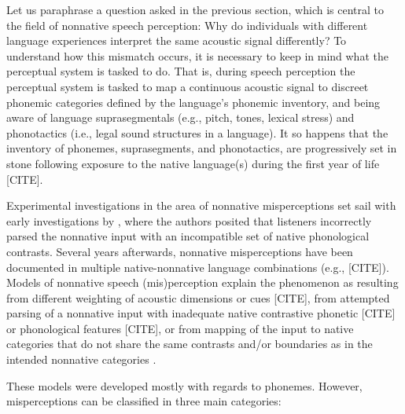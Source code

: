 Let us paraphrase a question asked in the previous section, which is central to the field of nonnative speech perception: Why do individuals with different language experiences interpret the same acoustic signal differently? To understand how this mismatch occurs, it is necessary to keep in mind what the perceptual system is tasked to do. That is, during speech perception the perceptual system is tasked to map a continuous acoustic signal to discreet phonemic categories defined by the language's phonemic inventory, and being aware of language suprasegmentals (e.g., pitch, tones, lexical stress) and phonotactics (i.e., legal sound structures in a language). It so happens that the inventory of phonemes, suprasegments, and phonotactics, are progressively set in stone following exposure to the native language(s) during the first year of life [CITE].

Experimental investigations in the area of nonnative misperceptions set sail with early investigations by \cite{polivanov1939, trubetzkoy1939}, where the authors posited that listeners incorrectly parsed the nonnative input with an incompatible set of native phonological contrasts. Several years afterwards, nonnative misperceptions have been documented in multiple native-nonnative language combinations (e.g., [CITE]). Models of nonnative speech (mis)perception explain the phenomenon as resulting from different weighting of acoustic dimensions or cues [CITE], from attempted parsing of a nonnative input with inadequate native contrastive phonetic [CITE] or phonological features [CITE], or from mapping of the input to native categories that do not share the same contrasts and/or boundaries as in the intended nonnative categories \cite{best1994, kuhl1995}. 

These models were developed mostly with regards to phonemes. However, misperceptions can be classified in three main categories:

